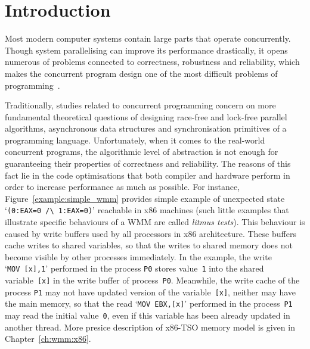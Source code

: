 \chapter{Introduction}
\label{ch:introduction}

Most modern computer systems contain large parts that operate concurrently. Though system parallelising can improve its performance drastically, it opens numerous of problems connected to correctness, robustness and reliability, which makes the concurrent program design one of the most difficult problems of programming~\cite{mckenney2017parallel}.

Traditionally, studies related to concurrent programming concern on more fundamental theoretical questions of designing race-free and lock-free parallel algorithms, asynchronous data structures and synchronisation primitives of a programming language. Unfortunately,
when it comes to 
the real-world concurrent programs, the algorithmic level of abstraction is not enough for guaranteeing their properties of correctness and reliability. The reasons of this fact lie in the code optimisations that both compiler and hardware perform in order to increase performance as much as possible. For instance, Figure~\ref{example:simple_wmm} provides simple example of
unexpected state `\texttt{(0:EAX=0~/\textbackslash~1:EAX=0)}' reachable in x86 machines (such little examples that illustrate specific behaviours of a WMM are called \textit{litmus tests}).
This behaviour is caused by write buffers used by all processors in x86 architecture. These buffers cache writes to shared variables, so that the writes to shared memory does not become visible by other processes immediately. In the example, the write `\texttt{MOV~[x],1}' performed in the process \texttt{P0} stores value~\texttt{1} into the shared variable~\texttt{[x]} in the write buffer of process~\texttt{P0}. Meanwhile, the write cache of the process \texttt{P1} may not have updated version of the variable~\texttt{[x]}, neither may have the main memory, so that the read `\texttt{MOV~EBX,[x]}' performed in the process~\texttt{P1} may read the initial value~\texttt{0}, even if this variable has been already updated in another thread. More presice description of x86-TSO memory model is given in Chapter~\ref{ch:wmm:x86}.

